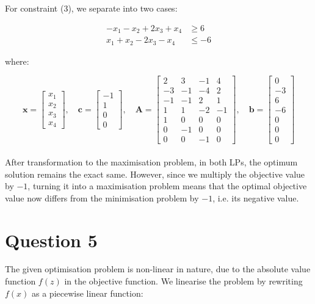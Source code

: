 \documentclass[12pt]{article}
\begin{document}
\noindent For constraint (3), we separate into two cases: 

\begin{align*}
    - x_{1} - x_{2} + 2 x_{3} + x_{4} & \geq 6 \\
    x_{1} + x_{2} -2 x_{3} -x_{4} & \leq -6
\end{align*}

\noindent where:

\begin{equation*}
    \mathbf{x} = \begin{bmatrix}
        x_{1} \\ x_{2} \\ x_{3} \\ x_{4} 
    \end{bmatrix},
    \quad 
    \mathbf{c} = \begin{bmatrix}
        -1 \\ 1 \\ 0 \\ 0
    \end{bmatrix},
    \quad 
    \mathbf{A} = \begin{bmatrix}
        2 & 3 & -1 & 4 \\ 
        -3 & -1 & -4 & 2 \\ 
        -1 & -1 & 2 & 1 \\ 
        1 & 1 & -2 & -1 \\ 
        1 & 0 & 0 & 0 \\ 
        0 & -1 & 0 & 0 \\ 
        0 & 0 & -1 & 0 
    \end{bmatrix},
    \quad 
    \mathbf{b} = \begin{bmatrix}
        0 \\ -3 \\ 6 \\ -6 \\ 0 \\ 0 \\ 0
    \end{bmatrix}
\end{equation*} \\

\noindent After transformation to the maximisation problem, in both LPs, the optimum solution remains the exact same. However, since we multiply the objective value by $-1$, turning it into a maximisation problem means that the optimal objective value now differs from the minimisation problem by $-1$, i.e. its negative value. 

\newpage 
\section*{Question 5}
The given optimisation problem is non-linear in nature, due to the absolute value function $f(z)$ in the objective function. We linearise the problem by rewriting $f(x)$ as a piecewise linear function:
\end{document}
